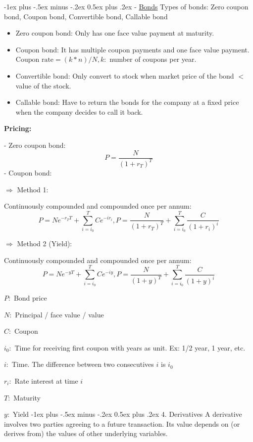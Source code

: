 \documentclass[10pt,landscape]{article}
\makeatletter
\renewcommand{\section}{\@startsection{section}{1}{0mm}%
                                {-1ex plus -.5ex minus -.2ex}%
                                {0.5ex plus .2ex}%
                                {\normalfont\large\bfseries}}
\renewcommand{\subsection}{\@startsection{subsection}{2}{0mm}%
                                {-1ex plus -.5ex minus -.2ex}%
                                {0.5ex plus .2ex}%
                                {\normalfont\normalsize\bfseries}}
\makeatother
\begin{document}
\begin{multicols}{3}
    \subsection{- \underline{Bonds}}
    Types of bonds:
    Zero coupon bond, Coupon bond, Convertible bond, Callable bond
    \begin{itemize}[label={--},leftmargin=4mm]
        \vspace{-1mm}
        \itemsep -.4mm
        \item Zero coupon bond: Only has one face value payment at maturity.
        \item Coupon bond: It has multiple coupon payments and one face value payment.
            $\text{Coupon rate} = (k*n)/N, k:$ number of coupons per year.
        \item Convertible bond: Only convert to stock when market price of the bond $<$ value of the stock.
        \item Callable bond: Have to return the bonds for the company at a fixed price when the company decides to call it back.
    \end{itemize}

    \textbf{Pricing:}
    
    - Zero coupon bond:
    $$P=\frac{N}{(1+r_T)^T}$$
    - Coupon bond:
    
    
    $\Rightarrow$ Method 1:
    
    Continuously compounded and compounded once per annum:
    $$P=Ne^{-r_TT} + \sum_{i=i_0}^T Ce^{-ir_i}, P=\frac{N}{(1+r_T)^T} + \sum_{i=i_0}^T \frac{C}{(1+r_i)^i}$$

    $\Rightarrow$ Method 2 (Yield):
    
    Continuously compounded and compounded once per annum:
    $$P=Ne^{-yT} + \sum_{i=i_0}^T Ce^{-iy}, P=\frac{N}{(1+y)^T} + \sum_{i=i_0}^T \frac{C}{(1+y)^{i}}$$

    $P:$ Bond price
    
    $N:$ Principal / face value / value

    $C:$ Coupon

    $i_0:$ Time for receiving first coupon with years as unit. Ex: 1/2 year, 1 year, etc. 
    
    $i:$ Time. The difference between two consecutives $i$ is $i_0$
    
    $r_i:$ Rate interest at time $i$

    $T:$ Maturity

    $y:$ Yield
    \section{4. Derivatives}
    A derivative involves two parties agreeing to a future transaction. Its value depends
on (or derives from) the values of other underlying variables.

\end{multicols}
\end{document}
